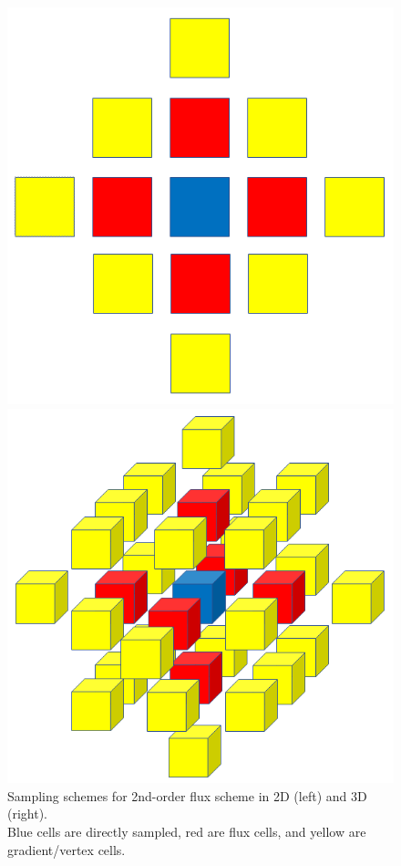 \begin{figure}
    \centering
    \begin{minipage}{0.45\linewidth}
        \includegraphics[width=0.99\linewidth]{Chapters/ProjROMs/Images/sampling_2d_2ndOrder.png}
    \end{minipage} \hspace{0.5em}
    \centering
    \begin{minipage}{0.52\linewidth}
        \includegraphics[width=0.99\linewidth]{Chapters/ProjROMs/Images/sampling_3d_2ndOrder.png}
    \end{minipage}
    \caption{\label{fig:IBlankConfig}Sampling schemes for 2nd-order flux scheme in 2D (left) and 3D (right).\\Blue cells are directly sampled, red are flux cells, and yellow are gradient/vertex cells.}
\end{figure}

